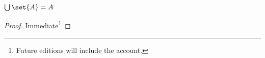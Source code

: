 \begin{prop}
	$\bigcup \set{A} = A$
\end{prop}
\begin{proof}
Immediate\footnote{Future editions will include the account.}
\end{proof}